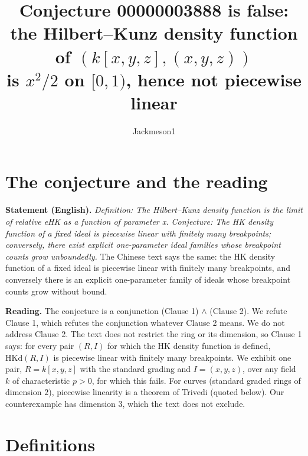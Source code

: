 \documentclass[11pt]{article}
\title{Conjecture 00000003888 is false:\\ the Hilbert--Kunz density function of $(k[x,y,z],(x,y,z))$\\ is $x^2/2$ on $[0,1)$, hence not piecewise linear}
\author{Jackmeson1}
\date{}
\theoremstyle{definition}
\theoremstyle{remark}
\newcommand{\HKd}{\mathrm{HKd}}
\begin{document}
\maketitle

\section{The conjecture and the reading}

\textbf{Statement (English).} \emph{Definition: The Hilbert--Kunz density function is the limit of relative eHK as a
function of parameter x. Conjecture: The HK density function of a fixed ideal is piecewise linear with finitely many
breakpoints; conversely, there exist explicit one-parameter ideal families whose breakpoint counts grow unboundedly.}
The Chinese text says the same: the HK density function of a fixed ideal is piecewise linear with finitely many
breakpoints, and conversely there is an explicit one-parameter family of ideals whose breakpoint counts grow without
bound.

\textbf{Reading.} The conjecture is a conjunction (Clause 1) $\wedge$ (Clause 2). We refute Clause 1, which refutes the
conjunction whatever Clause 2 means. We do not address Clause 2. The text does not restrict the ring or its dimension,
so Clause 1 says: for every pair $(R,I)$ for which the HK density function is defined, $\HKd(R,I)$ is piecewise linear
with finitely many breakpoints. We exhibit one pair, $R=k[x,y,z]$ with the standard grading and $I=(x,y,z)$, over any
field $k$ of characteristic $p>0$, for which this fails. For curves (standard graded rings of dimension $2$), piecewise
linearity is a theorem of Trivedi (quoted below). Our counterexample has dimension $3$, which the text does not exclude.

\section{Definitions}
\end{document}
